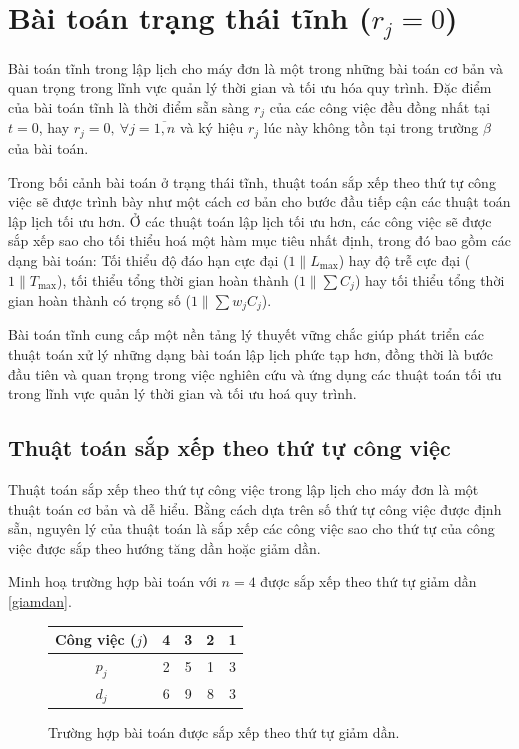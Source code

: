 \section{Bài toán trạng thái tĩnh ($r_j = 0$)}\label{1.2.}
Bài toán tĩnh trong lập lịch cho máy đơn là một trong những bài toán cơ bản và quan trọng trong lĩnh vực quản lý thời gian và tối ưu hóa quy trình. Đặc điểm của bài toán tĩnh là thời điểm sẵn sàng $r_j$ của các công việc đều đồng nhất tại $t=0$, hay $r_j = 0, \: \forall j=\overline{1,n}$ và ký hiệu $r_j$ lúc này không tồn tại trong trường $\beta$ của bài toán.

Trong bối cảnh bài toán ở trạng thái tĩnh, thuật toán sắp xếp theo thứ tự công việc sẽ được trình bày như một cách cơ bản cho bước đầu tiếp cận các thuật toán lập lịch tối ưu hơn. Ở các thuật toán lập lịch tối ưu hơn, các công việc sẽ được sắp xếp sao cho tối thiểu hoá một hàm mục tiêu nhất định, trong đó bao gồm các dạng bài toán: Tối thiểu độ đáo hạn cực đại ($1\|L_{\max}$) hay độ trễ cực đại ($1\|T_{\max}$), tối thiểu tổng thời gian hoàn thành ($1\|\sum C_j$) hay tối thiểu tổng thời gian hoàn thành có trọng số ($1\|\sum w_j C_j$).

Bài toán tĩnh cung cấp một nền tảng lý thuyết vững chắc giúp phát triển các thuật toán xử lý những dạng bài toán lập lịch phức tạp hơn, đồng thời là bước đầu tiên và quan trọng trong việc nghiên cứu và ứng dụng các thuật toán tối ưu trong lĩnh vực quản lý thời gian và tối ưu hoá quy trình.
\subsection{Thuật toán sắp xếp theo thứ tự công việc}
Thuật toán sắp xếp theo thứ tự công việc trong lập lịch cho máy đơn là một thuật toán cơ bản và dễ hiểu. Bằng cách dựa trên số thứ tự công việc được định sẵn, nguyên lý của thuật toán là sắp xếp các công việc sao cho thứ tự của công việc được sắp theo hướng tăng dần hoặc giảm dần.

\begin{vd}
	Minh hoạ trường hợp bài toán với $n=4$ được sắp xếp theo thứ tự giảm dần \eqref{giamdan}.
	
	\begin{figure}[h!]
	\centering
	\begin{tabular}{|c | c c c c |} 
		\hline
		Công việc ($j$) & 4 & 3 & 2 & 1 \\
		\hline\hline
		$p_j$ & 2 & 5 & 1 & 3 \\
		$d_j$ & 6 & 9 & 8 & 3 \\
		\hline
	\end{tabular}
	\caption{\label{giamdan} Trường hợp bài toán được sắp xếp theo thứ tự giảm dần.}
	\end{figure}
\end{vd}
	
